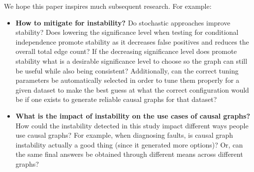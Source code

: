 \documentclass[]{svjour3}
\begin{document}
We hope this paper inspires much subsequent research. For example:
\begin{itemize}
 
 \item   

 \textbf{How to mitigate for instability?} Do stochastic approaches improve stability? Does lowering the significance level when testing for conditional independence promote stability as it decreases false positives and reduces the overall total edge count? If the decreasing significance level does promote stability what is a desirable significance level to choose so the graph can still be useful while also being consistent? Additionally, can the correct tuning parameters be automatically selected  in order to tune them properly for a given dataset to make the best guess at what the correct configuration would be if one exists to generate reliable causal graphs for that dataset?

 

\item
    
    \textbf{What is the impact of instability on the use cases of causal graphs?} How could the instability detected in this study impact different ways people use causal graphs? For example, when diagnosing faults, is causal graph instability actually a good thing (since it generated more options)? Or, can the same final answers be obtained through different means across different graphs?   
    

\end{itemize}
\end{document}
